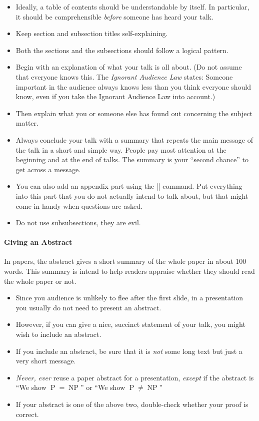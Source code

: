 \begin{itemize}
\item
  Ideally, a table of contents should be understandable by itself. In
  particular, it should be comprehensible \emph{before} someone has
  heard your talk.
\item
  Keep section and subsection titles self-explaining.
\item   
  Both the sections and the subsections should follow a logical
  pattern.
\item
  Begin with an explanation of what your talk is all about. (Do
  not assume that everyone knows this. The \emph{Ignorant Audience
  Law} states: Someone important in the audience always knows less
  than you think everyone should know, even if you take the Ignorant
  Audience Law into account.) 
\item
  Then explain what you or someone else has found out concerning the
  subject matter.
\item
  Always conclude your talk with a summary that repeats the main
  message of the talk in a short and simple way. People pay most
  attention at the beginning and at the end of talks. The summary is
  your ``second chance'' to get across a message.
\item
  You can also add an appendix part using the |\appendix| command. Put
  everything into this part that you do not actually intend to talk
  about, but that might come in handy when questions are asked.
\item
  Do not use subsubsections, they are evil.
\end{itemize}



\paragraph{Giving an Abstract}

In papers, the abstract gives a short summary of the whole paper in
about 100 words. This summary is intend to help readers appraise
whether they should read the whole paper or not.
\begin{itemize}
\item
  Since you audience is unlikely to flee after the first slide, in
  a presentation you usually do not need to present an abstract.
\item
  However, if you can give a nice, succinct statement of your
  talk, you might wish to include an abstract.
\item  
  If you include an abstract, be sure that it is \emph{not} some long 
  text but just a very short message.
\item
  \emph{Never, ever} reuse a paper abstract for a presentation,
  \emph{except} if the abstract is ``We show $\operatorname{P} =
  \operatorname{NP}$'' or ``We show $\operatorname{P} \neq
  \operatorname{NP}$''
\item
  If your abstract is one of the above two, double-check whether
  your proof is correct.
\end{itemize}





